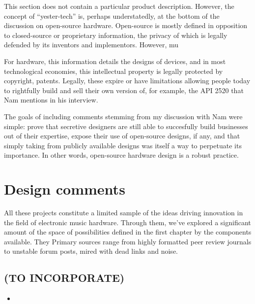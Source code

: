This section does not contain a particular product description. However, the concept of ``yester-tech'' is, perhaps understatedly, at the bottom of the discussion on open-source hardware. Open-source is mostly defined in opposition to closed-source or proprietary information, the privacy of which is legally defended by its inventors and implementors. However, mu

For hardware, this information details the designs of devices, and in most technological economies, this intellectual property is legally protected by copyright, patents. Legally, these expire or have limitations allowing people today to rightfully build and sell their own version of, for example, the API 2520 that Nam mentions in his interview. 

The goals of including comments stemming from my discussion with Nam were simple: prove that secretive designers are still able to succesfully build businesses out of their expertise, expose their use of open-source designs, if any, and that simply taking from publicly available designs was itself a way to perpetuate its importance. In other words, open-source hardware design is a robust practice. 

\section{Design comments}

All these projects constitute a limited sample of the ideas driving innovation in the field of electronic music hardware. Through them, we've explored a significant amount of the space of possibilities defined in the first chapter by the components available. They  Primary sources range from highly formatted peer review journals to unstable forum posts, mired with dead links and noise.  



\begin{unsortedStuff}	
\section*{(TO INCORPORATE)}
	\begin{itemize}
		\item 
	\end{itemize}
\end{unsortedStuff}
		
\begin{optBlankSpace}
	\newpage
	\mbox{}
\end{optBlankSpace}

